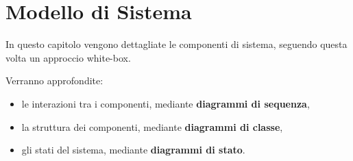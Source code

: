 \documentclass[../main.tex]{subfiles}
\begin{document}
\newpage
\chapter{Modello di Sistema}
In questo capitolo vengono dettagliate le componenti di sistema, seguendo questa volta un approccio white-box.

Verranno approfondite:
\begin{itemize}
    \item le interazioni tra i componenti, mediante \textbf{diagrammi di sequenza},
    \item  la struttura dei componenti, mediante \textbf{diagrammi di classe},
    \item  gli stati del sistema, mediante \textbf{diagrammi di stato}.
\end{itemize}
\vfill
\newpage
\end{document}
